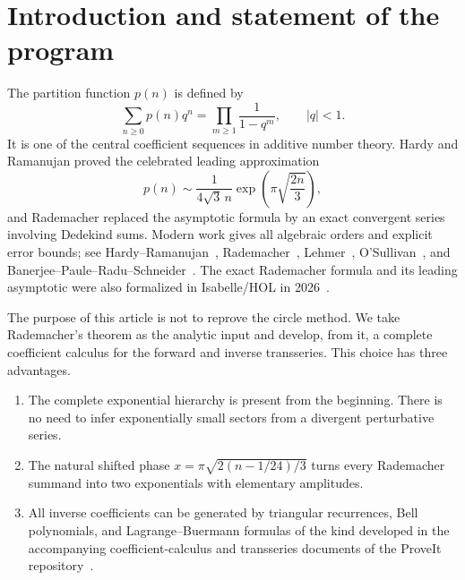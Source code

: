 \documentclass[11pt,a4paper]{article}
\numberwithin{equation}{section}
\theoremstyle{remark}
\begin{document}
\tableofcontents

\section{Introduction and statement of the program}

The partition function $p(n)$ is defined by
\begin{equation}\label{eq:partition-gf}
 \sum_{n\ge0}p(n)q^n=\prod_{m\ge1}\frac1{1-q^m},\qquad |q|<1.
\end{equation}
It is one of the central coefficient sequences in additive number theory.  Hardy and Ramanujan proved the celebrated leading approximation
\begin{equation}\label{eq:HR-leading}
 p(n)\sim \frac{1}{4\sqrt3\,n}
 \exp\!\left(\pi\sqrt{\frac{2n}{3}}\right),
\end{equation}
and Rademacher replaced the asymptotic formula by an exact convergent series involving Dedekind sums.  Modern work gives all algebraic orders and explicit error bounds; see Hardy--Ramanujan~\cite{HardyRamanujan1918}, Rademacher~\cite{Rademacher1937,Rademacher1938,Rademacher1943}, Lehmer~\cite{Lehmer1937,Lehmer1938,Lehmer1939}, O'Sullivan~\cite{OSullivan2023}, and Banerjee--Paule--Radu--Schneider~\cite{BanerjeeEtAl2022}.  The exact Rademacher formula and its leading asymptotic were also formalized in Isabelle/HOL in 2026~\cite{EberlPaulson2026}.

The purpose of this article is not to reprove the circle method.  We take Rademacher's theorem as the analytic input and develop, from it, a complete coefficient calculus for the forward and inverse transseries.  This choice has three advantages.

\begin{enumerate}
\item The complete exponential hierarchy is present from the beginning.  There is no need to infer exponentially small sectors from a divergent perturbative series.
\item The natural shifted phase $x=\pi\sqrt{2(n-1/24)/3}$ turns every Rademacher summand into two exponentials with elementary amplitudes.
\item All inverse coefficients can be generated by triangular recurrences, Bell polynomials, and Lagrange--Buer\-mann formulas of the kind developed in the accompanying coefficient-calculus and transseries documents of the ProveIt repository~\cite{ProveItCCC,ProveItTransseries}.
\end{enumerate}
\end{document}
